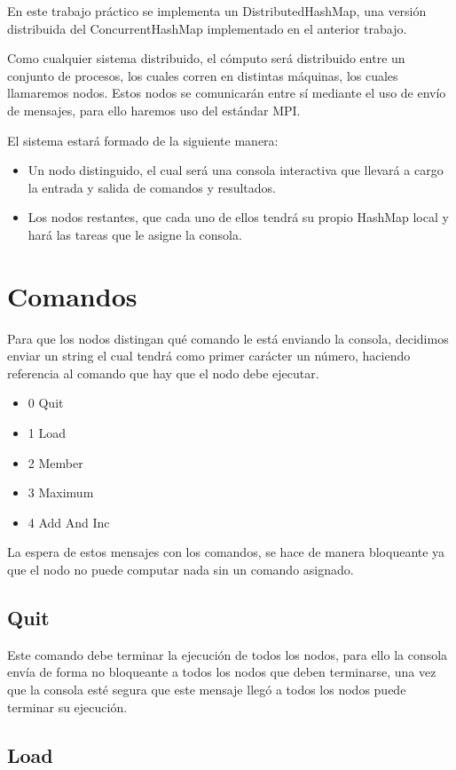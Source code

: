 En este trabajo práctico se implementa un DistributedHashMap, una versión distribuida del ConcurrentHashMap implementado en el anterior trabajo.

Como cualquier sistema distribuido, el cómputo será distribuido entre un conjunto de procesos, los cuales corren en distintas máquinas, los cuales llamaremos nodos. Estos nodos se comunicarán entre sí mediante el uso de envío de mensajes, para ello haremos uso del estándar MPI.

El sistema estará formado de la siguiente manera:
\begin{itemize}
\item Un nodo distinguido, el cual será una consola interactiva que llevará a cargo la entrada y salida de comandos y resultados.
\item Los nodos restantes, que cada uno de ellos tendrá su propio HashMap local y hará las tareas que le asigne la consola.
\end{itemize}

\section{Comandos}

Para que los nodos distingan qué comando le está enviando la consola, decidimos enviar un string el cual tendrá como primer carácter un número, haciendo referencia al comando que hay que el nodo debe ejecutar.
\begin{itemize}
\item 0 Quit
\item 1 Load
\item 2 Member
\item 3 Maximum
\item 4 Add And Inc
\end{itemize}

La espera de estos mensajes con los comandos, se hace de manera bloqueante ya que el nodo no puede computar nada sin un comando asignado.

\subsection{Quit}

Este comando debe terminar la ejecución de todos los nodos, para ello la consola envía de forma no bloqueante a todos los nodos que deben terminarse, una vez que la consola esté segura que este mensaje llegó a todos los nodos puede terminar su ejecución.

\subsection{Load}

